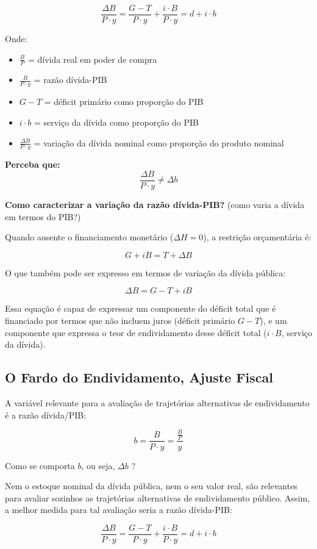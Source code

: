 \documentclass[a4paper,12pt]{article}[abntex2]
\begin{document}
\[
\frac{\Delta B}{P \cdot y} = \frac{G - T}{P \cdot y} + \frac{i \cdot B}{P \cdot y} = d + i \cdot b
\]

Onde:
\begin{itemize}
    \item $\frac{B}{P}$ = dívida real em poder de compra
    \item $\frac{B}{P \cdot y}$ = razão dívida-PIB
    \item $G - T$ = déficit primário como proporção do PIB
    \item $i \cdot b$ = serviço da dívida como proporção do PIB
    \item $\frac{\Delta B}{P \cdot y}$ = variação da dívida nominal como proporção do produto nominal
\end{itemize}

\textbf{Perceba que:}
\[
\frac{\Delta B}{P \cdot y} \ne \Delta b
\]

\textbf{Como caracterizar a variação da razão dívida-PIB?} (como varia a dívida em termos do PIB?)

Quando ausente o financiamento monetário ($\Delta H = 0$), a restrição orçamentária é:

\[
G + iB = T + \Delta B
\]

O que também pode ser expresso em termos de variação da dívida pública:

\[
\Delta B = G - T + iB
\]

Essa equação é capaz de expressar um componente do déficit total que é financiado por termos que não incluem juros (déficit primário $G - T$), e um componente que expressa o teor de endividamento desse déficit total ($i \cdot B$, serviço da dívida).

\subsection{\textbf{O Fardo do Endividamento, Ajuste Fiscal}}
A variável relevante para a avaliação de trajetórias alternativas de endividamento é a razão dívida/PIB:

\[
b = \frac{B}{P \cdot y} = \frac{\frac{B}{P}}{y}
\]

Como se comporta \(b\), ou seja, \(\Delta b\) ?

Nem o estoque nominal da dívida pública, nem o seu valor real, são relevantes para avaliar sozinhos as trajetórias alternativas de endividamento público. Assim, a melhor medida para tal avaliação seria a razão dívida-PIB:

\[
\frac{\Delta B}{P \cdot y} = \frac{G - T}{P \cdot y} + \frac{i \cdot B}{P \cdot y} = d + i \cdot b
\]
\end{document}
